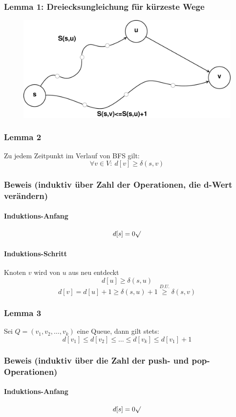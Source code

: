 \subsubsection{Lemma 1: Dreiecksungleichung für kürzeste Wege}
\begin{figure}[h]
\centering
\includegraphics[width=0.7\linewidth]{16/Grafik/Dreiecksungleichung}
\caption{}
\label{fig:Dreiecksungleichung}
\end{figure}

\subsubsection{Lemma 2}
Zu jedem Zeitpunkt im Verlauf von BFS gilt:
\[ \forall v\in V:~ d[v] \geq \delta(s,v)\]
\subsubsection{Beweis (induktiv über Zahl der Operationen, die d-Wert verändern)}
\paragraph{Induktions-Anfang} \[ d[s] = 0 \surd\]
\paragraph{Induktions-Schritt} Knoten $v$ wird von $u$ aus neu entdeckt
\[ d[u]\geq \delta(s,u) \]
\[ d[v] = d[u]+1 \geq \delta(s,u)+1 \overset{D.U.}{\geq} \delta(s,v) \]
\subsubsection{Lemma 3}
Sei $Q=(v_1,v_2,\ldots,v_k)$ eine Queue, dann gilt stets:
\[ d[v_1]\leq d[v_2]\leq\ldots\leq d[v_k]\leq d[v_1]+1 \]
\subsubsection{Beweis (induktiv über die Zahl der push- und pop-Operationen)}
\paragraph{Induktions-Anfang}
\[ d[s] = 0 \surd\]
